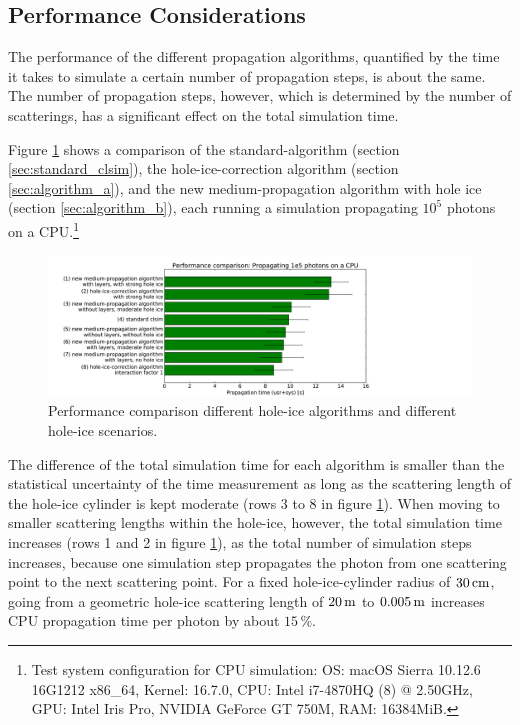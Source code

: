 \subsection{Performance Considerations}
\label{sec:performance}

The performance of the different propagation algorithms, quantified by
the time it takes to simulate a certain number of propagation steps, is
about the same. The number of propagation steps, however, which is
determined by the number of scatterings, has a significant effect on the
total simulation time.

Figure \ref{fig:Go7Maquo} shows a comparison of the
standard-\clsim algorithm (section \ref{sec:standard_clsim}), the
hole-ice-correction algorithm (section \ref{sec:algorithm_a}), and the
new medium-propagation algorithm with hole ice (section
\ref{sec:algorithm_b}), each running a simulation propagating \(10^5\)
photons on a
CPU.\footnote{Test system configuration for CPU simulation: OS: macOS Sierra 10.12.6 16G1212 x86\_64, Kernel: 16.7.0, CPU: Intel i7-4870HQ (8) @ 2.50GHz, GPU: Intel Iris Pro, NVIDIA GeForce GT 750M, RAM: 16384MiB.}

\begin{figure}[htbp]
  \includegraphics[width=\textwidth, trim = {1cm 0 10cm 0.7cm}, clip]{img/performance-comparison}
  \caption{Performance comparison different hole-ice algorithms and different hole-ice scenarios.}
  \label{fig:Go7Maquo}
\end{figure}


The difference of the total simulation time for each algorithm is
smaller than the statistical uncertainty of the time measurement as long
as the scattering length of the hole-ice cylinder is kept moderate (rows
3 to 8 in figure \ref{fig:Go7Maquo}). When moving to smaller scattering
lengths within the hole-ice, however, the total simulation time
increases (rows 1 and 2 in figure \ref{fig:Go7Maquo}), as the total
number of simulation steps increases, because one simulation step
propagates the photon from one scattering point to the next scattering
point. For a fixed hole-ice-cylinder radius of \(30\text{\,cm}\), going from a
geometric hole-ice scattering length of \(20\text{\,m}\) to \(0.005\text{\,m}\)
increases CPU propagation time per photon by about \(15\,\%\).

